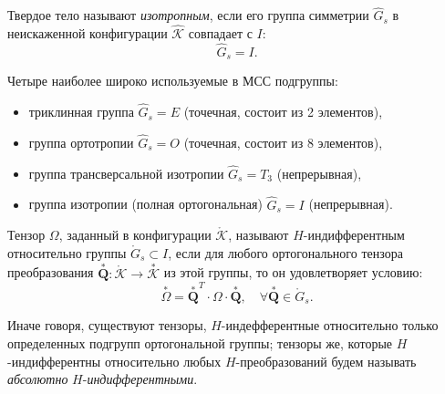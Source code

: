 
\begin{definition*}
	Твердое тело называют \textit{изотропным}, если его группа симметрии $\hat{G}_s$ в неискаженной конфигурации $\hat{\mathcal{K}}$ совпадает с $I$:
	\begin{equation*}
		\hat{G}_s = I.
	\end{equation*}
\end{definition*}

Четыре наиболее широко используемые в МСС подгруппы:
\begin{itemize}
	\item триклинная группа $\hat{G}_s = E$ (точечная, состоит из 2 элементов), 
	
	\item группа ортотропии $\hat{G}_s = O$ (точечная, состоит из 8 элементов), 
	
	\item группа трансверсальной изотропии $\hat{G}_s = T_3$ (непрерывная),
	
	\item группа изотропии (полная ортогональная) $\hat{G}_s = I$ (непрерывная). 
\end{itemize}

\begin{definition*}
	Тензор $\Omega$, заданный в конфигурации $\mathring{\mathcal{K}}$, называют $H$-индифферентным относительно группы $\mathring{G}_s \subset I$, если для любого ортогонального тензора преобразования $\overset{\ast}{\mathbf{Q}} : \mathring{\mathcal{K}} \to \overset{\ast}{\mathcal{K}}$ из этой группы, то он удовлетворяет условию:
	\begin{equation*}
		\overset{\ast}{\Omega} = \overset{\ast}{\mathbf{Q}}^{T} \cdot \Omega \cdot \overset{\ast}{\mathbf{Q}}, \quad \forall \overset{\ast}{\mathbf{Q}} \in \mathring{G}_s.
	\end{equation*}
	
	Иначе говоря, существуют тензоры, $H$-индефферентные относительно только определенных подгрупп ортогональной группы; тензоры же, которые $H$-индифферентны относительно любых $H$-преобразований будем называть \textit{абсолютно} $H$-\textit{индифферентными}.
\end{definition*}